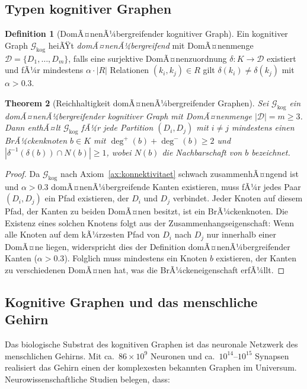 ﻿\documentclass[12pt,a4paper]{article}
\theoremstyle{plain}
\newtheorem{theorem}{Theorem}[section]
\theoremstyle{definition}
\newtheorem{definition}[theorem]{Definition}
\theoremstyle{remark}
\newcommand{\GG}{\mathcal{G}}
\begin{document}
\subsection{Typen kognitiver Graphen}

\begin{definition}[DomÃ¤nenÃ¼bergreifender kognitiver Graph]
\label{def:domainueber}
Ein kognitiver Graph $\GG_{\text{kog}}$ heiÃŸt \emph{domÃ¤nenÃ¼bergreifend} mit DomÃ¤nenmenge $\mathcal{D} = \{D_1, \ldots, D_m\}$, falls eine surjektive DomÃ¤nenzuordnung $\delta: K \to \mathcal{D}$ existiert und fÃ¼r mindestens $\alpha \cdot |R|$ Relationen $(k_i, k_j) \in R$ gilt $\delta(k_i) \neq \delta(k_j)$ mit $\alpha > 0.3$.
\end{definition}

\begin{theorem}[Reichhaltigkeit domÃ¤nenÃ¼bergreifender Graphen]
\label{thm:reichhaltigkeit}
Sei $\GG_{\text{kog}}$ ein domÃ¤nenÃ¼bergreifender kognitiver Graph mit DomÃ¤nenmenge $|\mathcal{D}| = m \geq 3$. Dann enthÃ¤lt $\GG_{\text{kog}}$ fÃ¼r jede Partition $(D_i, D_j)$ mit $i \neq j$ mindestens einen \emph{BrÃ¼ckenknoten} $b \in K$ mit $\deg^+(b) + \deg^-(b) \geq 2$ und $|\delta^{-1}(\delta(b)) \cap N(b)| \geq 1$, wobei $N(b)$ die Nachbarschaft von $b$ bezeichnet.
\end{theorem}

\begin{proof}
Da $\GG_{\text{kog}}$ nach Axiom~\ref{ax:konnektivitaet} schwach zusammenhÃ¤ngend ist und $\alpha > 0.3$ domÃ¤nenÃ¼bergreifende Kanten existieren, muss fÃ¼r jedes Paar $(D_i, D_j)$ ein Pfad existieren, der $D_i$ und $D_j$ verbindet. Jeder Knoten auf diesem Pfad, der Kanten zu beiden DomÃ¤nen besitzt, ist ein BrÃ¼ckenknoten. Die Existenz eines solchen Knotens folgt aus der Zusammenhangseigenschaft: Wenn alle Knoten auf dem kÃ¼rzesten Pfad von $D_i$ nach $D_j$ nur innerhalb einer DomÃ¤ne liegen, widerspricht dies der Definition domÃ¤nenÃ¼bergreifender Kanten ($\alpha > 0.3$). Folglich muss mindestens ein Knoten $b$ existieren, der Kanten zu verschiedenen DomÃ¤nen hat, was die BrÃ¼ckeneigenschaft erfÃ¼llt.
\end{proof}

\subsection{Kognitive Graphen und das menschliche Gehirn}

Das biologische Substrat des kognitiven Graphen ist das neuronale Netzwerk des menschlichen Gehirns. Mit ca.~$86 \times 10^9$ Neuronen und ca.~$10^{14}$--$10^{15}$ Synapsen realisiert das Gehirn einen der komplexesten bekannten Graphen im Universum. Neurowissenschaftliche Studien belegen, dass:
\end{document}
